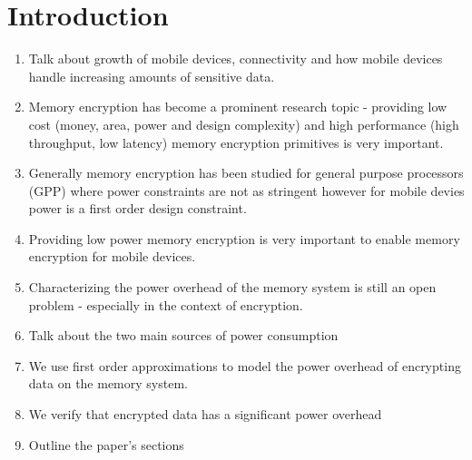 \section{Introduction}
\label{sec-introduction}

\begin{enumerate}
  \item Talk about growth of mobile devices, connectivity and how mobile
    devices handle increasing amounts of sensitive data.
  \item Memory encryption has become a prominent research topic - providing low
    cost (money, area, power and design complexity) and high performance (high
    throughput, low latency) memory encryption primitives is very important.
  \item Generally memory encryption has been studied for general purpose
    processors (GPP) where power constraints are not as stringent however for
    mobile devies power is a first order design constraint.
  \item Providing low power memory encryption is very important to enable
    memory encryption for mobile devices.
  \item Characterizing the power overhead of the memory system is still an open
    problem - especially in the context of encryption.
  \item Talk about the two main sources of power consumption 
  \item We use first order approximations to model the power overhead of
    encrypting data on the memory system.
  \item We verify that encrypted data has a significant power overhead 
  \item Outline the paper's sections
\end{enumerate}

